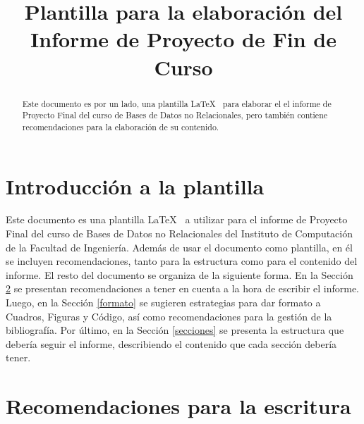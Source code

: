 \documentclass[journal,onecolumn]{IEEEtran}
\begin{document}
\title{Plantilla para la elaboración del Informe de Proyecto de Fin de Curso}


\author{
}

\maketitle

\begin{abstract}
Este documento es por un lado, una plantilla \LaTeX~ para elaborar el el informe de Proyecto Final del curso de Bases de Datos no Relacionales, pero también contiene recomendaciones para la elaboración de su contenido.
\end{abstract}



\section{Introducción a la plantilla}
\label{intro}
Este documento es una plantilla \LaTeX~ a utilizar para el informe de Proyecto Final del curso de Bases de Datos no Relacionales del Instituto de Computación de la Facultad de Ingeniería. Además de usar el documento como plantilla, en él se incluyen recomendaciones, tanto para la estructura como para el contenido del informe. El resto del documento se organiza de la siguiente forma. En la Sección \ref{escritura} se presentan recomendaciones a tener en cuenta a la hora de escribir el informe. Luego, en la Sección \ref{formato} se sugieren estrategias para dar formato a Cuadros, Figuras y Código, así como recomendaciones para la gestión de la bibliografía. Por último, en la Sección \ref{secciones} se presenta la estructura que debería seguir el informe, describiendo el contenido que cada sección debería tener. 

\section{Recomendaciones para la escritura}
\label{escritura}
\end{document}
